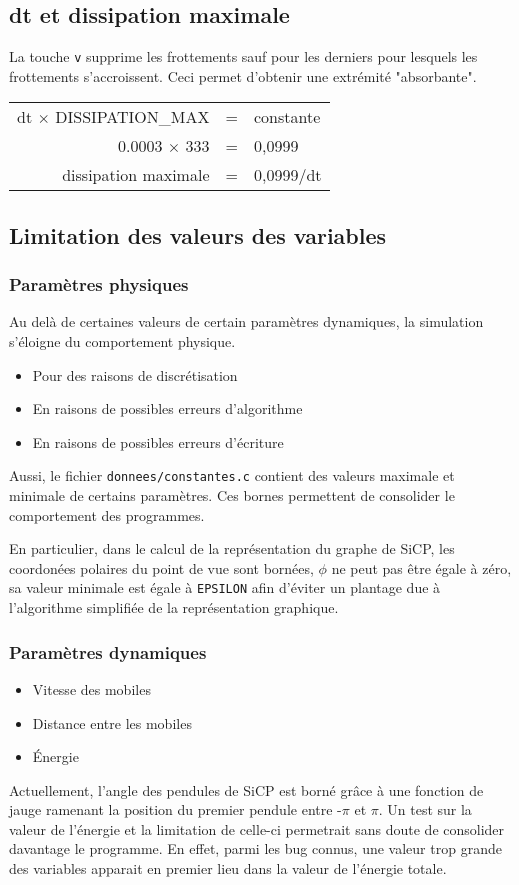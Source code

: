 \subsection{dt et dissipation maximale}
La touche \texttt{v} supprime les frottements sauf pour les derniers pour lesquels les frottements s'accroissent. Ceci permet d'obtenir une extrémité "absorbante".
\begin{center}
	\begin{tabular}{rcl}
	dt $\times$ DISSIPATION\_MAX & = & constante\\
	0.0003 $\times$ 333 & = & 0,0999\\
	dissipation maximale & = & 0,0999/dt\\
	\end{tabular}
\end{center}
%
%
\subsection{Limitation des valeurs des variables}
%
\subsubsection{Paramètres physiques}
%
Au delà de certaines valeurs de certain paramètres dynamiques, la simulation s'éloigne du comportement physique.
%
\begin{itemize}[label=, leftmargin=2cm]
\item Pour des raisons de discrétisation
\item En raisons de possibles erreurs d'algorithme
\item En raisons de possibles erreurs d'écriture
\end{itemize}
%
Aussi, le fichier \texttt{donnees/constantes.c} contient des valeurs maximale et minimale de certains paramètres. Ces bornes permettent de consolider le comportement des programmes.

En particulier, dans le calcul de la représentation du graphe de SiCP, les coordonées polaires du point de vue sont bornées, $\phi$ ne peut pas être égale à zéro, sa valeur minimale est égale à \texttt{EPSILON} afin d'éviter un plantage due à l'algorithme simplifiée de la représentation graphique.
%
\subsubsection{Paramètres dynamiques}
%
\begin{itemize}[label=, leftmargin=2cm]
\item Vitesse des mobiles
\item Distance entre les mobiles
\item Énergie
\end{itemize}
%
Actuellement, l'angle des pendules de SiCP est borné grâce à une fonction de jauge ramenant la position du premier pendule entre -$\pi$ et $\pi$.
Un test sur la valeur de l'énergie et la limitation de celle-ci permetrait sans doute de consolider davantage le programme. En effet, parmi les bug connus, une valeur trop grande des variables apparait en premier lieu dans la valeur de l'énergie totale.

